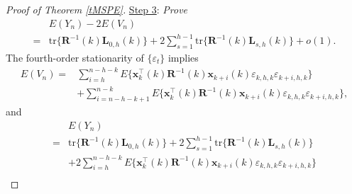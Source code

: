 \documentclass[ejsv2]{imsart}
\theoremstyle{plain}
\theoremstyle{definition}
\theoremstyle{remark}
\begin{document}
\begin{proof}[Proof of Theorem \ref{tMSPE}]
{\noindent
\underline{Step 3}: \textit{Prove 
\begin{equation}\label{ptMSPE.step 3}
\begin{split}
    & E(Y_n)-2E(V_n) \\
    = & \mathrm{tr}\{\mathbf{R}^{-1}(k)\mathbf{L}_{0,h}(k)\}+2\sum_{s=1}^{h-1}\mathrm{tr}\{\mathbf{R}^{-1}(k)\mathbf{L}_{s,h}(k)\}+o(1).
    \end{split}
\end{equation}
}
The fourth-order stationarity of $\{\varepsilon_t\}$ implies
\begin{equation}\label{ptMSPE.2}
\begin{split}
   E(V_n) %
     =& \sum_{i=h}^{n-h-k}E\{\mathbf{x}^\top_k(k)\mathbf{R}^{-1}(k)\mathbf{x}_{k+i}(k)\varepsilon_{k,h,k}\varepsilon_{k+i,h,k}\}\\
     &+\sum_{i=n-h-k+1}^{n-k}E\{\mathbf{x}^\top_k(k)\mathbf{R}^{-1}(k)\mathbf{x}_{k+i}(k)\varepsilon_{k,h,k}\varepsilon_{k+i,h,k}\},
\end{split}
\end{equation}
and
\begin{equation}\label{ptMSPE.3}
\begin{split}
   &E(Y_n)\\
   =&\mathrm{tr}\{\mathbf{R}^{-1}(k)\mathbf{L}_{0,h}(k)\}+2\sum_{s=1}^{h-1}\mathrm{tr}\{\mathbf{R}^{-1}(k)\mathbf{L}_{s,h}(k)\}\\
   &+2\sum_{i=h}^{n-h-k}E\{\mathbf{x}_k^\top(k)\mathbf{R}^{-1}(k)\mathbf{x}_{k+i}(k)\varepsilon_{k,h,k}\varepsilon_{k+i,h,k}\}\\

\end{split}
\end{equation}}
\end{proof}
\end{document}
